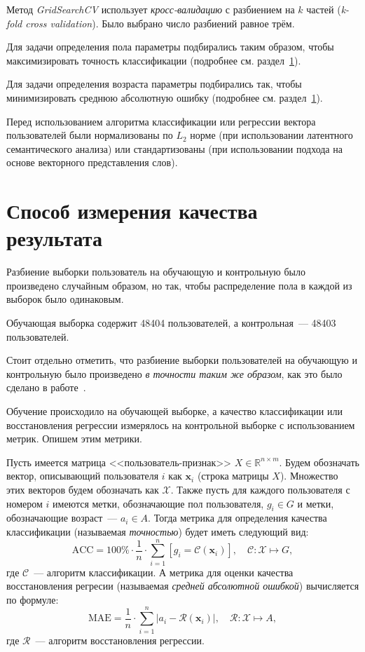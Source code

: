 Метод \textit{GridSearchCV} использует \textit{кросс-валидацию}
с разбиением на $k$ частей (\textit{k-fold cross validation}).
Было выбрано число разбиений равное трём.

Для задачи определения пола параметры подбирались таким
образом, чтобы максимизировать точность классификации (подробнее
см. раздел~\ref{sec:result_quality}).

Для задачи определения возраста параметры подбирались так, чтобы
минимизировать среднюю абсолютную ошибку (подробнее см.
раздел~\ref{sec:result_quality}).

Перед использованием алгоритма классификации или регрессии
вектора пользователей были нормализованы по $L_2$ норме
(при использовании латентного семантического анализа) или
стандартизованы (при использовании подхода на основе
векторного представления слов).

\section{Способ измерения качества результата}
\label{sec:result_quality}

Разбиение выборки пользователь на обучающую и контрольную
было произведено случайным образом, но так, чтобы распределение
пола в каждой из выборок было одинаковым.

Обучающая выборка содержит 48404 пользователей, а контрольная~---
48403 пользователей.

Стоит отдельно отметить, что разбиение выборки пользователей на
обучающую и контрольную было произведено \textit{в точности таким
же образом}, как это было сделано в работе~\cite{wu2014gender}.

Обучение происходило на обучающей выборке, а качество классификации
или восстановления регрессии измерялось на контрольной выборке
с использованием метрик. Опишем этим метрики. 


Пусть имеется матрица <<пользователь-признак>>
$X \in \mathbb{R}^{n \times m}$. Будем обозначать вектор,
описывающий пользователя $i$ как $\bm{x}_i$ (строка матрицы $X$).
Множество этих векторов будем обозначать как $\mathcal{X}$.
Также пусть для каждого пользователя с номером $i$ имеются метки,
обозначающие пол пользователя, $g_i \in G$ и метки, обозначающие
возраст~--- $a_i \in A$. Тогда метрика для определения качества
классификации (называемая \textit{точностью}) будет иметь следующий вид:
\[
    \mathrm{ACC} = 
    100\% \cdot \frac{1}{n} \cdot 
    \sum_{i=1}^{n}[g_i = \mathcal{C}(\bm{x}_i)],
    \quad \mathcal{C} \colon \mathcal{X} \mapsto G,
\]
где $\mathcal{C}$~--- алгоритм классификации. А метрика для оценки
качества восстановления регресии (называемая \textit{средней
абсолютной ошибкой}) вычисляется по формуле:
\[
    \mathrm{MAE} =
    \frac{1}{n} \cdot \sum_{i=1}^{n} 
    \left|a_i - \mathcal{R}(\bm{x}_i)\right|,
    \quad \mathcal{R} \colon \mathcal{X} \mapsto A,
\]
где $\mathcal{R}$~--- алгоритм восстановления регрессии.

